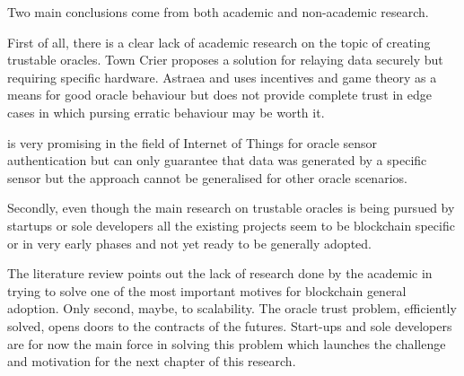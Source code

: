Two main conclusions come from both academic and non-academic research.

First of all, there is a clear lack of academic research on the topic of creating trustable oracles. Town Crier proposes a solution for relaying data securely but requiring specific hardware. Astraea and \cite{MontotoMonroy2018BitcoinBlockchain} uses incentives and game theory as a means for good oracle behaviour but does not provide complete trust in edge cases in which pursing erratic behaviour may be worth it.

\cite{Eberhardt2018Off-chainingComputations} is very promising in the field of Internet of Things for oracle sensor authentication but can only guarantee that data was generated by a specific sensor but the approach cannot be generalised for other oracle scenarios.

Secondly, even though the main research on trustable oracles is being pursued by startups or sole developers all the existing projects seem to be blockchain specific or in very early phases and not yet ready to be generally adopted.

The literature review points out the lack of research done by the academic in trying to solve one of the most important motives for blockchain general adoption. Only second, maybe, to scalability. The oracle trust problem, efficiently solved, opens doors to the contracts of the futures. Start-ups and sole developers are for now the main force in solving this problem which launches the challenge and motivation for the next chapter of this research.